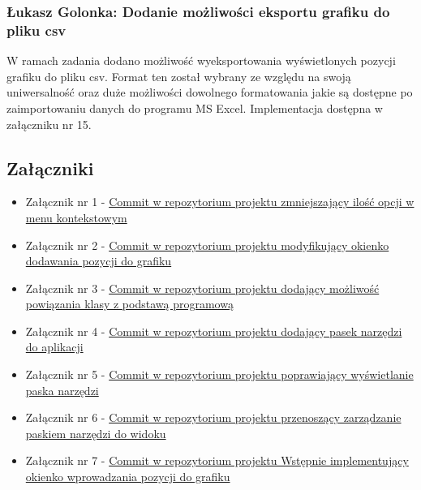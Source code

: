 \documentclass[12pt,a4paper,oneside]{article}
\theoremstyle{definition}
\numberwithin{equation}{section}
\begin{document}
\subsubsection{Łukasz Golonka: Dodanie możliwości eksportu grafiku do pliku csv}
W ramach zadania dodano możliwość wyeksportowania wyświetlonych pozycji grafiku do pliku csv.
Format ten został wybrany ze względu na swoją uniwersalność oraz duże możliwości dowolnego formatowania jakie są dostępne po zaimportowaniu danych do programu MS Excel.
Implementacja dostępna w załączniku nr 15.


\subsection{Załączniki}
\begin{itemize}
\item Załącznik nr 1 - \href{https://github.com/lukaszgo1/engineering_project_2022/commit/1807f34678a5940b36bcbea7407224c9ea4142ab}{Commit w repozytorium projektu zmniejszający ilość opcji w menu kontekstowym}
\item Załącznik nr 2 - \href{https://github.com/lukaszgo1/engineering_project_2022/commit/f4b1f22299328794a14487390e3c698d1763dd00}{Commit w repozytorium projektu modyfikujący okienko dodawania pozycji do grafiku}
\item Załącznik nr 3 - \href{https://github.com/lukaszgo1/engineering_project_2022/commit/56420ada0b0a60ab2cbd6e5fda40b68271330d3f}{Commit w repozytorium projektu dodający możliwość powiązania klasy z podstawą programową}
\item Załącznik nr 4 - \href{https://github.com/lukaszgo1/engineering_project_2022/commit/dfb622b84fd1e21f7649248df3dad96013d2deb5}{Commit w repozytorium projektu dodający pasek narzędzi do aplikacji}
\item Załącznik nr 5 - \href{https://github.com/lukaszgo1/engineering_project_2022/commit/6adeb26e162a14669d40813456dfd21fe0cf4389}{Commit w repozytorium projektu poprawiający wyświetlanie paska narzędzi}
\item Załącznik nr 6 - \href{https://github.com/lukaszgo1/engineering_project_2022/commit/6f41565d96de18d2d68b954a7334a4056f5cf154}{Commit w repozytorium projektu przenoszący zarządzanie paskiem narzędzi do widoku}
\item Załącznik nr 7 - \href{https://github.com/lukaszgo1/engineering_project_2022/commit/940233bd6bc5f586b3a83642cd7790683cd380c2}{Commit w repozytorium projektu Wstępnie implementujący okienko wprowadzania pozycji do grafiku}

\end{itemize}
\end{document}
